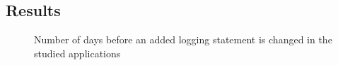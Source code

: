 




%	



%	





\subsection{Results }

\begin{figure}[tb]
	\setlength{\belowcaptionskip}{-10pt}
	\centering
	\caption{Number of days before an added logging statement is changed in the studied applications } 
	\label{fig:numberofdays}
\end{figure}

